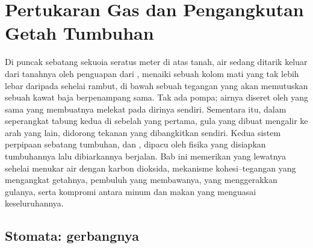 \chapter{Pertukaran Gas dan Pengangkutan Getah Tumbuhan}\label{ch:b1:plant-transport}

Di puncak sebatang sekuoia seratus meter di atas tanah, air sedang
ditarik keluar dari tanahnya oleh penguapan dari , menaiki
sebuah kolom  mati yang tak lebih lebar daripada sehelai rambut, di
bawah sebuah tegangan yang akan memutuskan sebuah kawat baja
berpenampang sama. Tak ada pompa; airnya diseret oleh 
yang sama yang membuatnya melekat pada dirinya sendiri. Sementara itu,
dalam seperangkat tabung kedua di sebelah yang pertama, gula yang
dibuat  mengalir ke arah yang lain, didorong tekanan yang
dibangkitkan  sendiri. Kedua sistem perpipaan sebatang
tumbuhan,  dan , dipacu oleh fisika yang disiapkan
tumbuhannya lalu dibiarkannya berjalan. Bab ini memerikan  yang
lewatnya sehelai  menukar air dengan karbon dioksida, mekanisme
kohesi--tegangan yang mengangkat getahnya, pembuluh yang membawanya,
 yang menggerakkan gulanya, serta kompromi
antara minum dan makan yang menguasai keseluruhannya.

\section{Stomata: gerbangnya}

